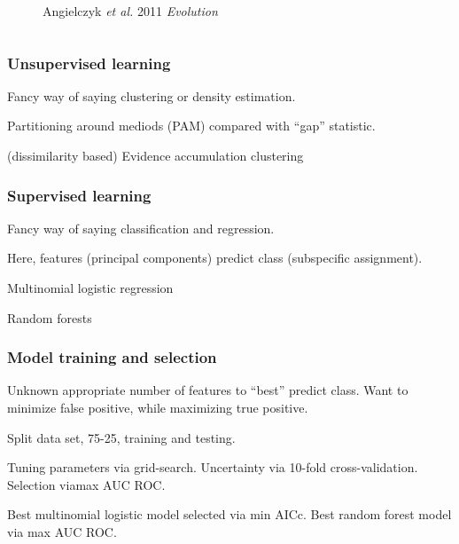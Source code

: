 \documentclass{beamer}\usepackage{graphicx, color}
\begin{document}
\begin{frame}
\begin{columns}
\begin{column}{0.5\textwidth}
\begin{figure}[h]
        \caption*{\scriptsize{Angielczyk \textit{et al.} 2011 \textit{Evolution}}}
        \label{fig:plast}
      \end{figure}
    \end{column}
  \end{columns}
\end{frame}

\begin{frame}
  \frametitle{Unsupervised learning}

  Fancy way of saying clustering or density estimation.

  Partitioning around mediods (PAM) compared with ``gap'' statistic.

  (dissimilarity based) Evidence accumulation clustering
\end{frame}

\begin{frame}
  \frametitle{Supervised learning}

  Fancy way of saying classification and regression.

  Here, features (principal components) predict class (subspecific assignment).

  Multinomial logistic regression

  Random forests
\end{frame}

\begin{frame}
  \frametitle{Model training and selection}
  Unknown appropriate number of features to ``best'' predict class. Want to minimize false positive, while maximizing true positive.

  Split data set, 75-25, training and testing.

  Tuning parameters via grid-search. Uncertainty via 10-fold cross-validation. Selection viamax AUC ROC.

  Best multinomial logistic model selected via min AICc. Best random forest model via max AUC ROC.

\end{frame}
\end{document}
